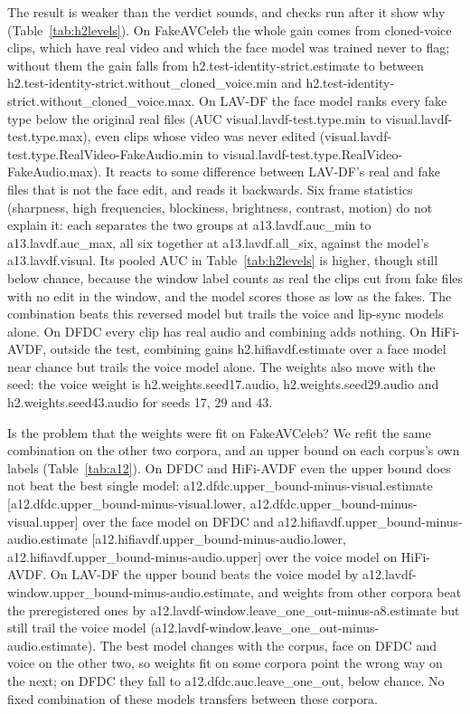 \documentclass[conference]{IEEEtran}
\begin{document}
The result is weaker than the verdict sounds, and checks run after it show
why (Table~\ref{tab:h2levels}). On FakeAVCeleb the whole gain comes from
cloned-voice clips, which have real video and which the face model was trained
never to flag; without them the gain falls from
{{h2.test-identity-strict.estimate}} to between
{{h2.test-identity-strict.without_cloned_voice.min}} and
{{h2.test-identity-strict.without_cloned_voice.max}}. On LAV-DF the face model
ranks every fake type below the original real files (AUC
{{visual.lavdf-test.type.min}} to {{visual.lavdf-test.type.max}}), even clips
whose video was never edited ({{visual.lavdf-test.type.RealVideo-FakeAudio.min}}
to {{visual.lavdf-test.type.RealVideo-FakeAudio.max}}). It reacts to some
difference between LAV-DF's real and fake files that is not the face edit, and
reads it backwards. Six frame statistics (sharpness, high frequencies,
blockiness, brightness, contrast, motion) do not explain it: each separates the
two groups at {{a13.lavdf.auc_min}} to {{a13.lavdf.auc_max}}, all six together
at {{a13.lavdf.all_six}}, against the model's {{a13.lavdf.visual}}. Its pooled
AUC in Table~\ref{tab:h2levels} is higher, though still below chance, because
the window label counts as real the clips cut from fake files with no edit in
the window, and the model scores those as low as the fakes. The combination
beats this reversed model but trails the voice and lip-sync models alone. On
DFDC every clip has real audio and combining adds nothing. On HiFi-AVDF,
outside the test, combining gains {{h2.hifiavdf.estimate}} over a face model
near chance but trails the voice model alone. The weights also move with the
seed: the voice weight is {{h2.weights.seed17.audio}},
{{h2.weights.seed29.audio}} and {{h2.weights.seed43.audio}} for seeds 17, 29
and 43.

Is the problem that the weights were fit on FakeAVCeleb? We refit the same
combination on the other two corpora, and an upper bound on each corpus's own
labels (Table~\ref{tab:a12}). On DFDC and HiFi-AVDF even the upper bound does
not beat the best single model:
{{a12.dfdc.upper_bound-minus-visual.estimate}}
[{{a12.dfdc.upper_bound-minus-visual.lower}},
{{a12.dfdc.upper_bound-minus-visual.upper}}] over the face model on DFDC and
{{a12.hifiavdf.upper_bound-minus-audio.estimate}}
[{{a12.hifiavdf.upper_bound-minus-audio.lower}},
{{a12.hifiavdf.upper_bound-minus-audio.upper}}] over the voice model on
HiFi-AVDF. On LAV-DF the upper bound beats the voice model by
{{a12.lavdf-window.upper_bound-minus-audio.estimate}}, and weights from other
corpora beat the preregistered ones by
{{a12.lavdf-window.leave_one_out-minus-a8.estimate}} but still trail the voice
model ({{a12.lavdf-window.leave_one_out-minus-audio.estimate}}). The best model
changes with the corpus, face on DFDC and voice on the other two, so weights fit
on some corpora point the wrong way on the next; on DFDC they fall to
{{a12.dfdc.auc.leave_one_out}}, below chance. No fixed combination of these
models transfers between these corpora.
\end{document}
